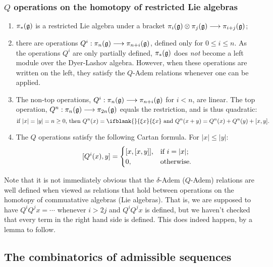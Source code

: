 \documentclass[11pt]{article}
\newcommand{\restn}[2][]{\ifblank{#1}{\xi{#2}}{\xi_{#1}{#2}}}%
\renewcommand{\Q}{Q}
\begin{document}
\begin{SteenrodAlgebrasAndTheirKoszulDuals}
\subsubsection{$\Q$ operations on the homotopy of restricted Lie algebras}
\begin{enumerate}\squishlist
\setlength{\parindent}{.25in}
\item $\pi_*(\mathfrak{g})$ is a restricted Lie algebra under a bracket $\pi_i(\mathfrak{g})\otimes \pi_j(\mathfrak{g})\longrightarrow \pi_{i+j}(\mathfrak{g})$;
\item there are operations $\Q^i:\pi_n(\frakg)\to \pi_{n+i}(\frakg)$, defined only for $0\leq i\leq n$. As the operations $\Q^i$ are only partially defined, $\pi_*(\mathfrak{g})$ does \emph{not} become a left module over the Dyer-Lashov algebra. However, when these operations are written on the left, they satisfy the $\Q$-Adem relations whenever one can be applied.
\item The non-top operations, $\Q^i:\pi_n(\frakg)\to \pi_{n+i}(\frakg)$ for $i<n$, are linear. The top operation, $\Q^n:\pi_n(\frakg)\to \pi_{2n}(\frakg)$ equals the restriction, and is thus quadratic:
\[\textup{if $|x|=|y|=n\geq0$, then }\Q^n(x)=\restn{x}\textup{ and }\Q^n(x+y)=\Q^n(x)+\Q^n(y)+[x,y].\]
\item The $\Q$ operations satisfy the following Cartan formula. For $|x|\leq |y|$:
\[[\Q^i(x),y]=\begin{cases}
[x,[x,y]],&\textup{if }i=|x|;\\
0,&\textup{otherwise}.
\end{cases}
\]
\end{enumerate}

Note that it is not immediately obvious that the $\delta$-Adem ($\Q$-Adem) relations are well defined when viewed as relations that hold between operations on the homotopy of commuatative algebras (Lie algebras). That is, we are supposed to have $\Q^i\Q^jx=\cdots $ whenever $i>2j$ and $\Q^i\Q^jx$ is defined, but we haven't checked that every term in the right hand side is defined. This does indeed happen, by a lemma to follow. 

\subsection{The combinatorics of admissible sequences}


\end{SteenrodAlgebrasAndTheirKoszulDuals}
\end{document}
